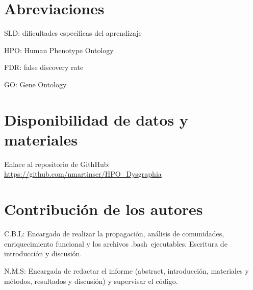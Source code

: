 \documentclass{bmcart}
\begin{document}
	\begin{backmatter}
	
		\section*{Abreviaciones}%
			SLD: dificultades específicas del aprendizaje
			
			HPO: Human Phenotype Ontology
			
			FDR: false discovery rate
			
			GO: Gene Ontology
		
		\section*{Disponibilidad de datos y materiales}%
			Enlace al repositorio de GithHub: \url{https://github.com/nmartinser/HPO_Dysgraphia}
		
		\section*{Contribución de los autores}
			
			C.B.L: Encargado de realizar la propagación, análisis de comunidades, enriquecimiento funcional y los archivos .bash ejecutables. Escritura de introducción y discusión.
			
			N.M.S: Encargada de redactar el informe (abstract, introducción, materiales y métodos, resultados y discusión) y supervisar el código.
			 
		
		
		
	
	\end{backmatter}
\end{document}
